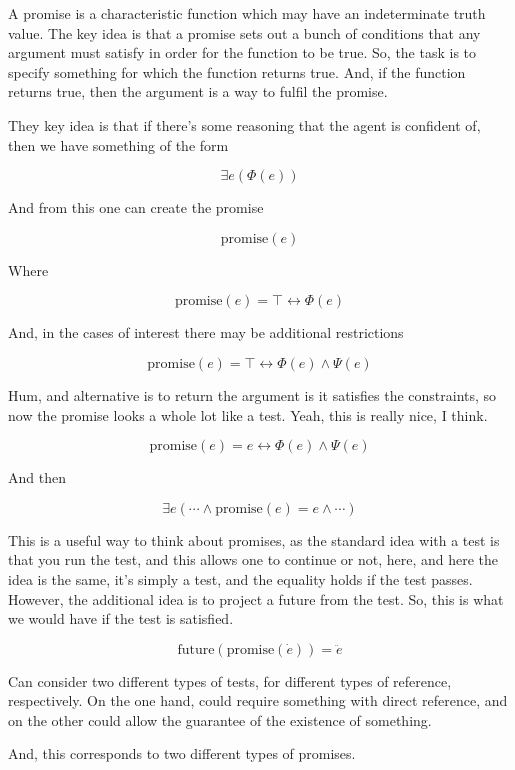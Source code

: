 \documentclass[10pt]{article}
\begin{document}
\begin{note}[Promise]
  A promise is a characteristic function which may have an indeterminate truth value.
  The key idea is that a promise sets out a bunch of conditions that any argument must satisfy in order for the function to be true.
  So, the task is to specify something for which the function returns true.
  And, if the function returns true, then the argument is a way to fulfil the promise.

  They key idea is that if there's some reasoning that the agent is confident of, then we have something of the form

  \[\exists e(\Phi(e))\]

  And from this one can create the promise

  \[\text{promise}(e)\]

  Where

  \[\text{promise}(e) = \top \leftrightarrow \Phi(e)\]

  And, in the cases of interest there may be additional restrictions

  \[\text{promise}(e) = \top \leftrightarrow \Phi(e) \land \Psi(e)\]

  Hum, and alternative is to return the argument is it satisfies the constraints, so now the promise looks a whole lot like a test.
  Yeah, this is really nice, I think.


  \[\text{promise}(e) = e \leftrightarrow \Phi(e) \land \Psi(e)\]

  And then

  \[\exists e(\cdots \land \text{promise}(e) = e \land \cdots)\]

  This is a useful way to think about promises, as the standard idea with a test is that you run the test, and this allows one to continue or not, here, and here the idea is the same, it's simply a test, and the equality holds if the test passes.
  However, the additional idea is to project a future from the test.
  So, this is what we would have if the test is satisfied.

  \[\text{future}(\text{promise}(\dot{e})) = \ddot{e}\]
\end{note}

\begin{note}[Constructive?]
  Can consider two different types of tests, for different types of reference, respectively.
  On the one hand, could require something with direct reference, and on the other could allow the guarantee of the existence of something.
  
  And, this corresponds to two different types of promises.
\end{note}
\end{document}
